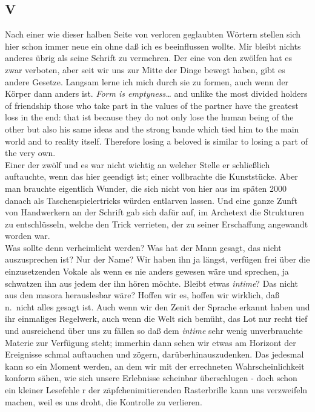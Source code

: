 \documentclass[
]{article}
\author{}
\date{\vspace{-2.5em}}
\begin{document}
\subsection{V}\label{v}

Nach einer wie dieser halben Seite von verloren geglaubten Wörtern
stellen sich hier schon immer neue ein ohne daß ich es beeinflussen
wollte. Mir bleibt nichts anderes übrig als seine Schrift zu vermehren.
Der eine von den zwölfen hat es zwar verboten, aber seit wir uns zur
Mitte der Dinge bewegt haben, gibt es andere Gesetze. Langsam lerne ich
mich durch sie zu formen, auch wenn der Körper dann anders ist.
\emph{Form is emptyness\ldots{}} and unlike the most divided holders of
friendship those who take part in the values of the partner have the
greatest loss in the end: that ist because they do not only lose the
human being of the other but also his same ideas and the strong bande
which tied him to the main world and to reality itself. Therefore losing
a beloved is similar to losing a part of the very own.\\
Einer der zwölf und es war nicht wichtig an welcher Stelle er
schließlich auftauchte, wenn das hier geendigt ist; einer vollbrachte
die Kunststücke. Aber man brauchte eigentlich Wunder, die sich nicht von
hier aus im späten 2000 danach als Taschenspielertricks würden entlarven
lassen. Und eine ganze Zunft von Handwerkern an der Schrift gab sich
dafür auf, im Archetext die Strukturen zu entschlüsseln, welche den
Trick verrieten, der zu seiner Erschaffung angewandt worden war.\\
Was sollte denn verheimlicht werden? Was hat der Mann gesagt, das nicht
auszusprechen ist? Nur der Name? Wir haben ihn ja längst, verfügen frei
über die einzusetzenden Vokale als wenn es nie anders gewesen wäre und
sprechen, ja schwatzen ihn aus jedem der ihn hören möchte. Bleibt etwas
\emph{intime}? Das nicht aus den masora herauslesbar wäre? Hoffen wir
es, hoffen wir wirklich, daß n.~nicht alles gesagt ist. Auch wenn wir
den Zenit der Sprache erkannt haben und ihr einmaliges Regelwerk, auch
wenn die Welt sich bemüht, das Lot nur recht tief und ausreichend über
uns zu fällen so daß dem \emph{intime} sehr wenig unverbrauchte Materie
zur Verfügung steht; immerhin dann sehen wir etwas am Horizont der
Ereignisse schmal auftauchen und zögern, darüberhinauszudenken. Das
jedesmal kann so ein Moment werden, an dem wir mit der errechneten
Wahrscheinlichkeit konform sähen, wie sich unsere Erlebnisse scheinbar
überschlugen - doch schon ein kleiner Lesefehle r der
zäpfchenimitierenden Rasterbrille kann uns verzweifeln machen, weil es
uns droht, die Kontrolle zu verlieren.
\end{document}
